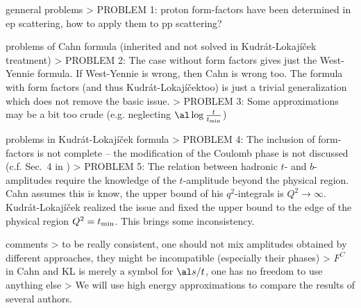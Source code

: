 \def\KL{Kudr\' at-Lokaj\' i\v cek}
\def\WY{West-Yennie}

\> genneral problems
\>> PROBLEM 1: proton form-factors have been determined in ep scattering, how to apply them to pp scattering?

\> problems of Cahn formula (inherited and not solved in \KL{} treatment)
\>> PROBLEM 2: The case without form factors gives just the \WY{} formula. If \WY{} is wrong, then Cahn is wrong too. The formula with form factors (and thus \KL too) is just a trivial generalization which does not remove the basic issue.
\>> PROBLEM 3: Some approximations may be a bit too crude (e.g. neglecting $\al \log {t\over t_{\rm min}}$)

\> problems in \KL{} formula
\>> PROBLEM 4: The inclusion of form-factors is not complete -- the modification of the Coulomb phase is not discussed (c.f. Sec.~4 in )
\>> PROBLEM 5: The relation between hadronic $t$- and $b$-amplitudes require the knowledge of the $t$-amplitude beyond the physical region. Cahn assumes this is know, the upper bound of his $q^2$-integrals is $Q^2\to\infty$. \KL{} realized the issue and fixed the upper bound to the edge of the physical region $Q^2 = t_{\rm min}$. This brings some inconsistency.

\> comments
\>> to be really consistent, one should not mix amplitudes obtained by different approaches, they might be incompatible (especially their phases) 
\>> $F^C$ in Cahn and KL is merely a symbol for $\al s/t$, one has no freedom to use anything else
\>> We will use high energy approximations to compare the results of several authors.

\vskip1cm

\iffalse
Out of the four fundamental forces, only two are important for forward scattering of protons, namely strong and electromagnetic. The gravitational force is too weak and the weak force has a negligible contribution only (\TODO{suppressed by the mass of its bosons}).

Bethe derived \bref{bethe58}
\eqref{F^{C+H}(t) = F^C(t) e^{i \al \Ph(t)} + F^H(t)}{el FCH decomp}
with the Coulomb-hadronic phase $\Phi$
\eqref{\Phi_{\rm Bethe}(t) = 2 \log {1.06\over a\sqrt{t}}}{el phase bethe}
\TODO{explain}
\fi

